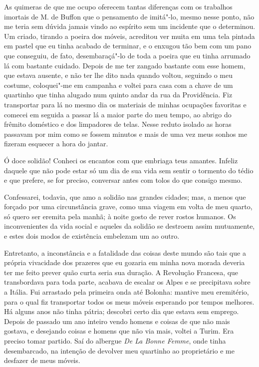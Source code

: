 As quimeras de que me ocupo oferecem tantas diferenças com os trabalhos
imortais de M. de Buffon que o pensamento de imitá"-lo, mesmo nesse
ponto, não me teria sem dúvida jamais vindo ao espírito sem um
incidente que o determinou. Um criado, tirando a poeira dos móveis,
acreditou ver muita em uma tela pintada em pastel que eu tinha acabado
de terminar, e o enxugou tão bem com um pano que conseguiu, de fato,
desembaraçá"-lo de toda a poeira que eu tinha arrumado lá com bastante
cuidado. Depois de me ter zangado bastante com esse homem, que estava
ausente, e não ter lhe dito nada quando voltou, seguindo o meu costume,
coloquei"-me em campanha e voltei para casa com a chave de um quartinho
que tinha alugado num quinto andar da rua da Providência. Fiz
transportar para lá no mesmo dia os materiais de minhas ocupações
favoritas e comecei em seguida a passar lá a maior parte do meu tempo,
ao abrigo do frêmito doméstico e dos limpadores de telas. Nesse reduto
isolado as horas passavam por mim como se fossem minutos e mais de uma
vez meus sonhos me fizeram esquecer a hora do jantar. 

Ó doce solidão! Conheci os encantos com que embriaga teus amantes.
Infeliz daquele que não pode estar só um dia de sua vida sem sentir o
tormento do tédio e que prefere, se for preciso, conversar antes com
tolos do que consigo mesmo.

Confessarei, todavia, que amo a solidão nas grandes cidades; mas, a
menos que forçado por uma circunstância grave, como uma viagem em volta
de meu quarto, só quero ser eremita pela manhã; à noite gosto de rever
rostos humanos. Os inconvenientes da vida social e aqueles da solidão
se destroem assim mutuamente, e estes dois modos de existência
embelezam um ao outro.

Entretanto, a inconstância e a fatalidade das coisas deste mundo são
tais que a própria vivacidade dos prazeres que eu gozaria em minha nova
morada deveria ter me feito prever quão curta seria sua duração. A
Revolução Francesa, que transbordava para toda parte, acabava de
escalar os Alpes e se precipitava sobre a Itália. Fui arrastado pela
primeira onda até Bolonha: mantive meu eremitério, para o qual fiz
transportar todos os meus móveis esperando por tempos melhores. Há alguns
anos não tinha pátria; descobri certo dia que estava sem emprego.
Depois de passado um ano inteiro vendo homens e coisas de que não mais
gostava, e desejando coisas e homens que não via mais, voltei a Turim.
Era preciso tomar partido. Saí do albergue  \textit{De La Bonne Femme},
onde tinha desembarcado, na intenção de devolver meu quartinho ao
proprietário e me desfazer de meus móveis.

